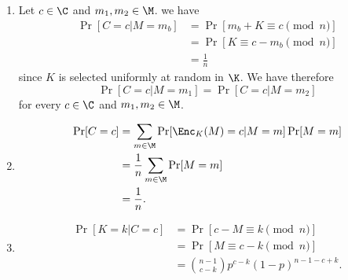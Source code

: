 \section{}
\subsection{}
\begin{solution}
  \begin{enumerate}
    \item
      Let $c \in \C$ and $m_1,m_2 \in \M$.
      we have
      \begin{align*}
        \Pr[C = c | M = m_b]
        & = \Pr[m_b + K \equiv c \pmod{n}]\\
        & = \Pr[K \equiv c - m_b \pmod{n}]\\
        & = \frac{1}{n}
      \end{align*}
      since $K$ is selected uniformly at random in $\K$.
      We have therefore
      \[
        \Pr[C = c | M = m_1] = \Pr[C = c | M = m_2]
      \]
      for every $c \in \C$ and $m_1,m_2 \in \M$.
    \item
      \begin{align*}
        \Pr[C = c]
        & = \sum_{m \in \M} \Pr[\Enc_K(M) = c | M = m] \Pr[M = m]\\
        & = \frac{1}{n} \sum_{m \in \M} \Pr[M = m]\\
        & = \frac{1}{n}.
      \end{align*}
    \item
      \begin{align*}
        \Pr[K = k | C = c]
        & = \Pr[c - M \equiv k \pmod{n}]\\
        & = \Pr[M \equiv c - k \pmod{n}]\\
        & = {n-1 \choose c-k} p^{c-k} (1-p)^{n-1-c+k}.
      \end{align*}
  \end{enumerate}
\end{solution}

